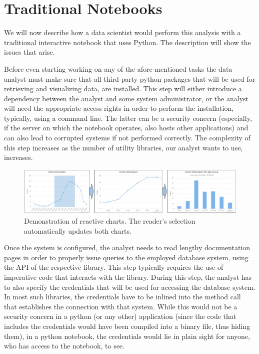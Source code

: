 
\vspace*{-0.4cm}
\section{Traditional Notebooks}



We will now describe how a data scientist would perform this analysis with a traditional interactive notebook that uses Python. The description will show the issues that arise.

 Before even starting working on any of the afore-mentioned tasks the data analyst must make sure that all third-party python packages that will be used for retrieving and visualizing data, are installed. This step will either introduce a dependency between the analyst and some system administrator, or the analyst will need the appropriate access rights in order to perform the installation, typically, using a command line. The latter can be a security concern (especially, if the server on which the notebook operates, also hosts other applications) and can also lead to corrupted systems if not performed correctly. The complexity of this step increases as the number of utility libraries, our analyst wants to use, increases. 

\begin{figure}[hbt!]
\centering
	\includegraphics[width=1\textwidth]{figures/reactive-processing2.pdf}
	\caption{Demonstration of reactive charts. The reader's selection automatically updates both charts.}
	\label{fig:reactive-data-processing}
	\vspace{-10pt}
\end{figure}


Once the system is configured, the analyst needs to read lengthy documentation pages in order to properly issue queries to the employed database system, using the API of the respective library. This step typically requires the use of imperative code that interacts with the library. During this step, the analyst has to also specify the credentials that will be used for accessing the database system. In most such libraries, the credentials have to be inlined into the method call that establishes the connection with that system. While this would not be a security concern in a python (or any other) application (since the code that includes the credentials would have been compiled into a binary file, thus hiding them), in a python notebook, the credentials would lie in plain sight for anyone, who has access to the notebook, to see.

